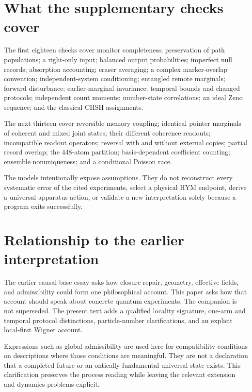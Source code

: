 \documentclass[11pt,a4paper]{article}
\begin{document}
\appendix
\section{What the supplementary checks cover}
The first eighteen checks cover monitor completeness; preservation of path
populations; a right-only input; balanced output probabilities; imperfect null
records; absorption accounting; eraser averaging; a complex marker-overlap
convention; independent-system conditioning; entangled remote marginals;
forward disturbance; earlier-marginal invariance; temporal bounds and changed
protocols; independent count moments; number-state correlations; an ideal
Zeno sequence; and the classical CHSH assignments.

The next thirteen cover reversible memory coupling; identical pointer
marginals of coherent and mixed joint states; their different coherence
readouts; incompatible readout operators; reversal with and without external
copies; partial record overlap; the 448-atom partition; basis-dependent
coefficient counting; ensemble nonuniqueness; and a conditional Poisson race.

The models intentionally expose assumptions. They do not reconstruct every
systematic error of the cited experiments, select a physical HYM endpoint,
derive a universal apparatus action, or validate a new interpretation solely
because a program exits successfully.

\section{Relationship to the earlier interpretation}
The earlier causal-base essay asks how closure repair, geometry, effective
fields, and admissibility could form one philosophical account. This paper
asks how that account should speak about concrete quantum experiments. The
companion is not superseded. The present text adds a qualified locality
signature, one-arm and temporal protocol distinctions, particle-number
clarifications, and an explicit local-first Wigner account.

Expressions such as global admissibility are used here for compatibility
conditions on descriptions where those conditions are meaningful. They are
not a declaration that a completed future or an ontically fundamental
universal state exists. This clarification preserves the process reading
while leaving the relevant extension and dynamics problems explicit.
\end{document}
